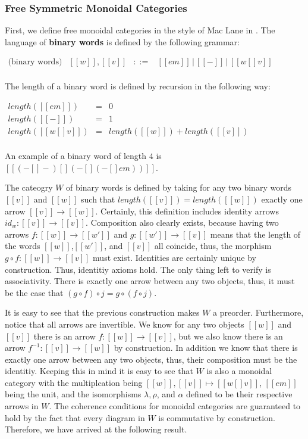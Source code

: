 \subsubsection{Free Symmetric Monoidal Categories}
\label{subsubsec:free_symmetric_monoidal_categories}
First, we define free monoidal categories in the style of Mac Lane in \cite{MacLane:1998}. 
The language of \textbf{binary words} is defined by the following grammar:
\begin{center}
  \begin{math}
    \begin{array}{llllllll}
      \text{(binary words)} & [[w]], [[v]] & ::= & [[em]]\,|\,[[-]]\,|\,[[w [] v]]\\
    \end{array}
  \end{math}
\end{center}
The length of a binary word is defined by recursion in the following way:
\begin{center}
  \begin{math}
    \begin{array}{lll}
      length([[em]])  & = & 0\\
      length([[-]]) & = & 1\\
      length([[w [] v]]) & = & length([[w]]) + length([[v]])\\
    \end{array}
  \end{math}
\end{center}
An example of a binary word of length $4$ is $[[(- [] -) [] (- [] (- [] em))]]$.  

The cateogry $W$ of binary words is defined by taking for any two binary words $[[v]]$ and $[[w]]$
such that $length([[v]]) = length([[w]])$ exactly one arrow $[[v]] \to [[w]]$.  Certainly, this definition includes
identity arrows $id_w : [[v]] \to [[v]]$.  Composition also clearly exists, because having two arrows
$f : [[w]] \to [[w']]$ and $g : [[w']] \to [[v]]$ means that the length of the words $[[w]]$,$[[w']]$, and
$[[v]]$ all coincide, thus, the morphism $g \circ f : [[w]] \to [[v]]$ must exist.  Identities are certainly unique
by construction.  Thus, identitiy axioms hold.  The only thing left to verify is associativity.   There is exactly
one arrow between any two objects, thus, it must be the case that $(g \circ f) \circ j = g \circ (f \circ j)$.  

It is easy to see that the previous construction makes $W$ a preorder.  Furthermore, notice that all arrows are invertible. We know
for any two objects $[[w]]$ and $[[v]]$ there is an arrow $f : [[w]] \to [[v]]$, but we also know there is an
arrow $f^{-1} : [[v]] \to [[w]]$ by construction.  In addition we know that there is exactly one arrow between
any two objects, thus, their composition must be the identitiy.  Keeping this in mind it is easy to see that $W$
is also a monoidal category with the multiplcation being $[[w]],[[v]] \mapsto [[w [] v]]$, $[[em]]$ being the 
unit, and the isomorphisms $\lambda,\rho$, and $\alpha$ defined to be their respective arrows in $W$. The
coherence conditions for monoidal categories are guaranteed to hold by the fact that every diagram in $W$ is
commutative by construction.  Therefore, we have arrived at the following result.

